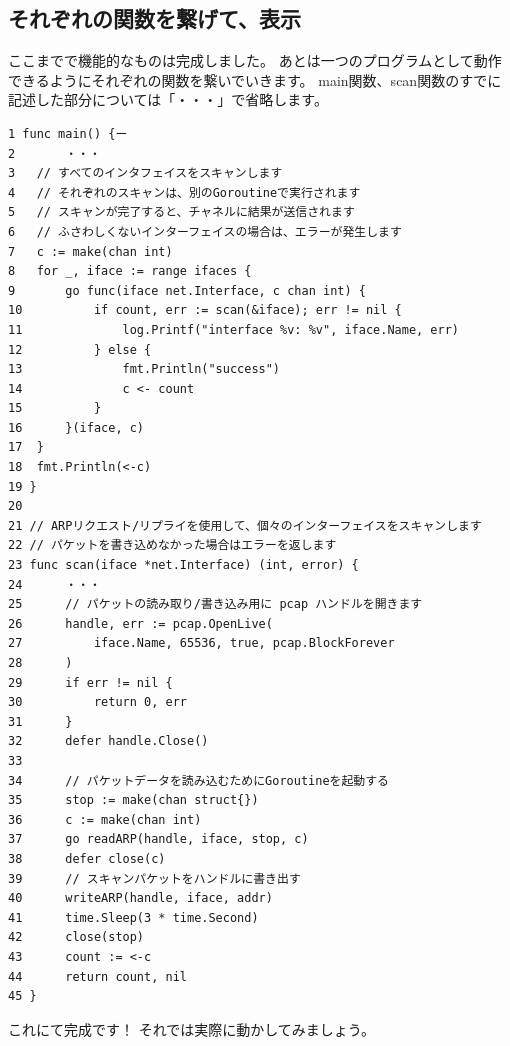 \subsection{それぞれの関数を繋げて、表示}
ここまでで機能的なものは完成しました。
あとは一つのプログラムとして動作できるようにそれぞれの関数を繋いでいきます。
main関数、scan関数のすでに記述した部分については「・・・」で省略します。
\begin{tcolorbox}[breakable]
    \begin{verbatim}
1 func main() {ー
2       ・・・
3   // すべてのインタフェイスをスキャンします
4   // それぞれのスキャンは、別のGoroutineで実行されます
5   // スキャンが完了すると、チャネルに結果が送信されます
6   // ふさわしくないインターフェイスの場合は、エラーが発生します
7   c := make(chan int)
8   for _, iface := range ifaces {
9       go func(iface net.Interface, c chan int) {
10          if count, err := scan(&iface); err != nil {
11              log.Printf("interface %v: %v", iface.Name, err)
12          } else {
13              fmt.Println("success")
14              c <- count
15          }
16      }(iface, c)
17  }
18  fmt.Println(<-c)
19 }
20
21 // ARPリクエスト/リプライを使用して、個々のインターフェイスをスキャンします
22 // パケットを書き込めなかった場合はエラーを返します
23 func scan(iface *net.Interface) (int, error) {
24      ・・・
25      // パケットの読み取り/書き込み用に pcap ハンドルを開きます
26      handle, err := pcap.OpenLive(
27          iface.Name, 65536, true, pcap.BlockForever
28      )
29	    if err != nil {
30		    return 0, err
31	    }
32	    defer handle.Close()
33
34	    // パケットデータを読み込むためにGoroutineを起動する
35	    stop := make(chan struct{})
36	    c := make(chan int)
37	    go readARP(handle, iface, stop, c)
38	    defer close(c)
39	    // スキャンパケットをハンドルに書き出す
40	    writeARP(handle, iface, addr)
41	    time.Sleep(3 * time.Second)
42	    close(stop)
43	    count := <-c
44	    return count, nil
45 }
    \end{verbatim}
\end{tcolorbox}
これにて完成です！
それでは実際に動かしてみましょう。

